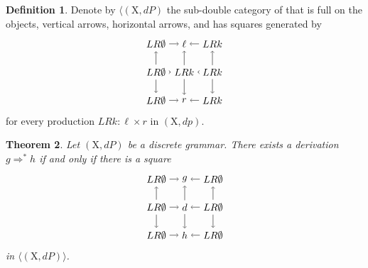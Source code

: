 \documentclass{amsart}
\newcommand{\X}{\cat{X}}
\newcommand{\cat}[1]{\mathrm{#1}}
\newcommand{\from}{\colon}
\newtheorem{theorem}{Theorem}[section]
\theoremstyle{remark}
\theoremstyle{definition}
\newtheorem{definition}[theorem]{Definition}
\begin{document}
\begin{definition}
  Denote by $ \langle ( \X , dP ) $ the sub-double category of
  that is full on the objects, vertical arrows, horizontal arrows, and
  has squares generated by
  \[
    \begin{tikzpicture}
      \node (1) at (0,2) {$ LR \emptyset $};
      \node (2) at (1,2) {$ \ell $};
      \node (3) at (2,2) {$ LR k  $};
      \node (4) at (0,1) {$ LR \emptyset $};
      \node (5) at (1,1) {$ LR k $};
      \node (6) at (2,1) {$ LR k $};
      \node (7) at (0,0) {$ LR \emptyset $};
      \node (8) at (1,0) {$ r $};
      \node (9) at (2,0) {$ LR k $};
      \draw [<-] (2) to node [] {\scriptsize{$  $}} (1);
      \draw [<-] (2) to node [] {\scriptsize{$  $}} (3);
      \draw [<-] (5) to node [] {\scriptsize{$  $}} (4);
      \draw [<-] (5) to node [] {\scriptsize{$  $}} (6);
      \draw [<-] (8) to node [] {\scriptsize{$  $}} (7);
      \draw [<-] (8) to node [] {\scriptsize{$  $}} (9);
      \draw [->] (4) to node [] {\scriptsize{$  $}} (1);
      \draw [->] (4) to node [] {\scriptsize{$  $}} (7);
      \draw [->] (5) to node [] {\scriptsize{$  $}} (2);
      \draw [->] (5) to node [] {\scriptsize{$  $}} (8);
      \draw [->] (6) to node [] {\scriptsize{$  $}} (3);
      \draw [->] (6) to node [] {\scriptsize{$  $}} (9);
    \end{tikzpicture}
  \]
  for every production $ LRk \from \ell \times r $ in $ ( \X , dp ) $.
\end{definition}


\begin{theorem}
  Let $ ( \X , dP ) $ be a discrete grammar. There exists a derivation
  $ g \Rightarrow^\ast h $ if and only if there is a square
  \[
    \begin{tikzpicture}
      \node (1) at (0,2) {$ LR \emptyset $};
      \node (2) at (1,2) {$ g $};
      \node (3) at (2,2) {$ LR \emptyset  $};
      \node (4) at (0,1) {$ LR \emptyset $};
      \node (5) at (1,1) {$ d $};
      \node (6) at (2,1) {$ LR \emptyset $};
      \node (7) at (0,0) {$ LR \emptyset $};
      \node (8) at (1,0) {$ h $};
      \node (9) at (2,0) {$ LR \emptyset $};
      \draw [<-] (2) to node [] {\scriptsize{$  $}} (1);
      \draw [<-] (2) to node [] {\scriptsize{$  $}} (3);
      \draw [<-] (5) to node [] {\scriptsize{$  $}} (4);
      \draw [<-] (5) to node [] {\scriptsize{$  $}} (6);
      \draw [<-] (8) to node [] {\scriptsize{$  $}} (7);
      \draw [<-] (8) to node [] {\scriptsize{$  $}} (9);
      \draw [->] (4) to node [] {\scriptsize{$  $}} (1);
      \draw [->] (4) to node [] {\scriptsize{$  $}} (7);
      \draw [->] (5) to node [] {\scriptsize{$  $}} (2);
      \draw [->] (5) to node [] {\scriptsize{$  $}} (8);
      \draw [->] (6) to node [] {\scriptsize{$  $}} (3);
      \draw [->] (6) to node [] {\scriptsize{$  $}} (9);
    \end{tikzpicture}
  \]
  in $ \langle ( \X , dP ) \rangle $.  
\end{theorem}
\end{document}

